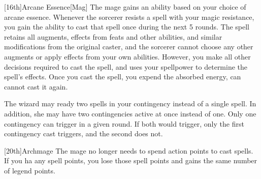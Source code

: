         [16th]{Arcane Essence}[Mag]
        The mage gains an ability based on your choice of arcane essence.
         Whenever the sorcerer resists a spell with your magic resistance, you gain the ability to cast that spell once during the next 5 rounds.
        The spell retains all augments, effects from feats and other abilities, and similar modifications from the original caster, and the sorcerer cannot choose any other augments or apply effects from your own abilities.
        However, you make all other decisions required to cast the spell, and uses your spellpower to determine the spell's effects.
        Once you cast the spell, you expend the absorbed energy, can cannot cast it again.

         The wizard may ready two spells in your contingency instead of a single spell.
        In addition, she may have two contingencies active at once instead of one.
        Only one contingency can trigger in a given round.
        If both would trigger, only the first contingency cast triggers, and the second does not.

        [20th]{Archmage}
        The mage no longer needs to spend action points to cast spells.
        If you ha any spell points, you lose those spell points and gains the same number of legend points.

